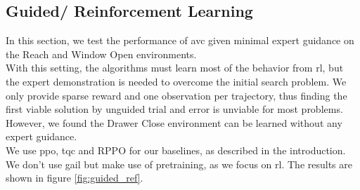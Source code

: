\subsection{Guided/ Reinforcement Learning}
\label{sec:g_ref_ler}
In this section, we test the performance of \ac{avc} given minimal expert guidance on the Reach and Window Open environments. \\
With this setting, the algorithms must learn most of the behavior from \ac{rl}, but the expert
demonstration is needed to overcome the initial search problem. We only provide sparse reward and one observation per trajectory, thus finding the first viable solution by unguided
trial and error is unviable for most problems. However, we found the Drawer Close environment can be learned without any expert guidance.\\

We use \ac{ppo}, \ac{tqc} and RPPO for our baselines, as described in the introduction. We don't use \ac{gail} but make use of pretraining, as we focus on \ac{rl}. The results
are shown in figure \ref{fig:guided_ref}.\\

